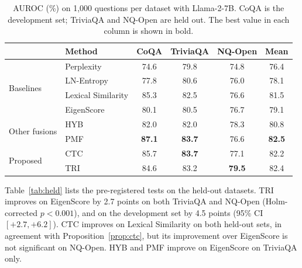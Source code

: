 \documentclass[10pt]{article}
\begin{document}
\begin{table}[t]
\centering
\caption{AUROC (\%) on 1,000 questions per dataset with Llama-2-7B. CoQA is the development set; TriviaQA and NQ-Open are held out. The best value in each column is shown in bold.}
\label{tab:auroc}
\begin{tabular}{@{}llcccc@{}}
\toprule
& Method & CoQA & TriviaQA & NQ-Open & Mean \\
\midrule
\multirow{4}{*}{Baselines} & Perplexity & 74.6 & 79.8 & 74.8 & 76.4 \\
& LN-Entropy & 77.8 & 80.6 & 76.0 & 78.1 \\
& Lexical Similarity & 85.3 & 82.5 & 76.6 & 81.5 \\
& EigenScore \citep{chen2024inside} & 80.1 & 80.5 & 76.7 & 79.1 \\
\midrule
\multirow{2}{*}{Other fusions} & HYB & 82.0 & 82.0 & 78.3 & 80.8 \\
& PMF & \textbf{87.1} & \textbf{83.7} & 76.6 & \textbf{82.5} \\
\midrule
\multirow{2}{*}{Proposed} & CTC & 85.7 & \textbf{83.7} & 77.1 & 82.2 \\
& TRI & 84.6 & 83.2 & \textbf{79.5} & 82.4 \\
\bottomrule
\end{tabular}
\end{table}

Table~\ref{tab:held} lists the pre-registered tests on the held-out datasets. TRI improves on EigenScore by 2.7 points on both TriviaQA and NQ-Open (Holm-corrected $p<0.001$), and on the development set by 4.5 points (95\% CI $[+2.7,+6.2]$). CTC improves on Lexical Similarity on both held-out sets, in agreement with Proposition~\ref{prop:ctc}, but its improvement over EigenScore is not significant on NQ-Open. HYB and PMF improve on EigenScore on TriviaQA only.
\end{document}
